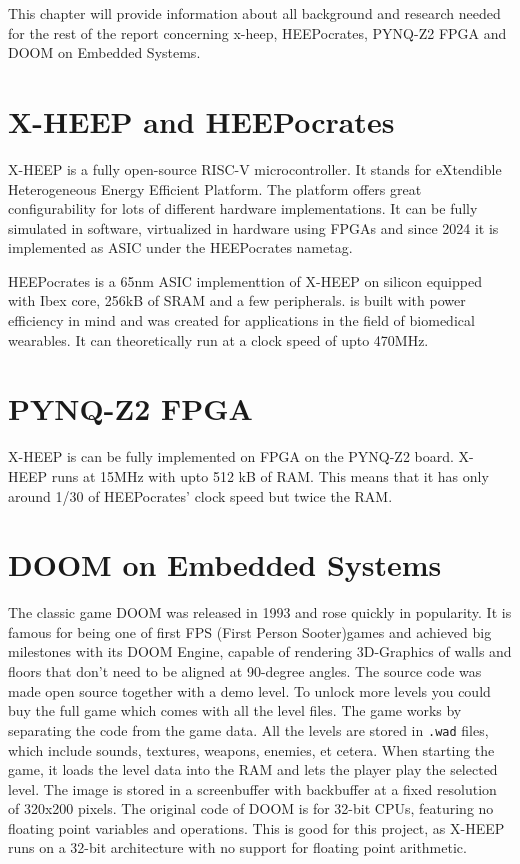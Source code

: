 This chapter will provide information about all background and research needed for the rest of the report concerning x-heep, HEEPocrates, PYNQ-Z2 FPGA and DOOM on Embedded Systems.

\section{X-HEEP and HEEPocrates}

X-HEEP is a fully open-source RISC-V microcontroller. It stands for eXtendible Heterogeneous Energy Efficient Platform. The platform offers great configurability for lots of different hardware implementations. It can be fully simulated in software, virtualized in hardware using FPGAs and since 2024 it is implemented as ASIC under the HEEPocrates nametag. \cite{xHeepWebsite}

HEEPocrates is a 65nm ASIC implementtion of X-HEEP on silicon equipped with Ibex core, 256kB of SRAM and a few peripherals. is built with power efficiency in mind and was created for applications in the field of biomedical wearables. It can theoretically run at a clock speed of upto 470MHz. \cite{heepocratesWebsite}


\section{PYNQ-Z2 FPGA}

X-HEEP is can be fully implemented on FPGA on the PYNQ-Z2 board. X-HEEP runs at 15MHz with upto 512 kB of RAM. This means that it has only around 1/30 of HEEPocrates' clock speed but twice the RAM.

\section{DOOM on Embedded Systems}

The classic game DOOM was released in 1993 and rose quickly in popularity. It is famous for being one of first FPS (First Person Sooter)games and achieved big milestones with its DOOM Engine, capable of rendering 3D-Graphics of walls and floors that don't need to be aligned at 90-degree angles. 
The source code was made open source together with a demo level. To unlock more levels you could buy the full game which comes with all the level files. The game works by separating the code from the game data. All the levels are stored in \texttt{.wad} files, which include sounds, textures, weapons, enemies, et cetera. When starting the game, it loads the level data into the RAM and lets the player play the selected level. The image is stored in a screenbuffer with backbuffer at a fixed resolution of 320x200 pixels. The original code of DOOM is for 32-bit CPUs, featuring no floating point variables and operations. This is good for this project, as X-HEEP runs on a 32-bit architecture with no support for floating point arithmetic.

